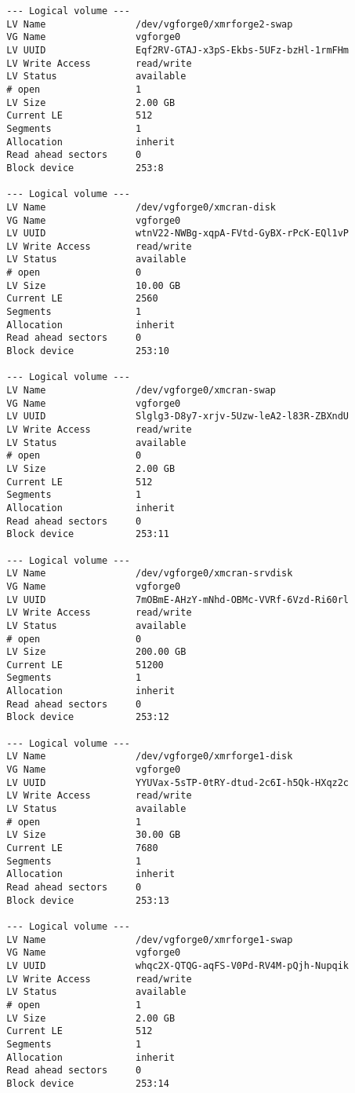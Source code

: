 \documentclass[a4paper]{article}
\begin{document}
\begin{verbatim}
  --- Logical volume ---
  LV Name                /dev/vgforge0/xmrforge2-swap
  VG Name                vgforge0
  LV UUID                Eqf2RV-GTAJ-x3pS-Ekbs-5UFz-bzHl-1rmFHm
  LV Write Access        read/write
  LV Status              available
  # open                 1
  LV Size                2.00 GB
  Current LE             512
  Segments               1
  Allocation             inherit
  Read ahead sectors     0
  Block device           253:8
   
  --- Logical volume ---
  LV Name                /dev/vgforge0/xmcran-disk
  VG Name                vgforge0
  LV UUID                wtnV22-NWBg-xqpA-FVtd-GyBX-rPcK-EQl1vP
  LV Write Access        read/write
  LV Status              available
  # open                 0
  LV Size                10.00 GB
  Current LE             2560
  Segments               1
  Allocation             inherit
  Read ahead sectors     0
  Block device           253:10
   
  --- Logical volume ---
  LV Name                /dev/vgforge0/xmcran-swap
  VG Name                vgforge0
  LV UUID                Slglg3-D8y7-xrjv-5Uzw-leA2-l83R-ZBXndU
  LV Write Access        read/write
  LV Status              available
  # open                 0
  LV Size                2.00 GB
  Current LE             512
  Segments               1
  Allocation             inherit
  Read ahead sectors     0
  Block device           253:11
   
  --- Logical volume ---
  LV Name                /dev/vgforge0/xmcran-srvdisk
  VG Name                vgforge0
  LV UUID                7mOBmE-AHzY-mNhd-OBMc-VVRf-6Vzd-Ri60rl
  LV Write Access        read/write
  LV Status              available
  # open                 0
  LV Size                200.00 GB
  Current LE             51200
  Segments               1
  Allocation             inherit
  Read ahead sectors     0
  Block device           253:12
   
  --- Logical volume ---
  LV Name                /dev/vgforge0/xmrforge1-disk
  VG Name                vgforge0
  LV UUID                YYUVax-5sTP-0tRY-dtud-2c6I-h5Qk-HXqz2c
  LV Write Access        read/write
  LV Status              available
  # open                 1
  LV Size                30.00 GB
  Current LE             7680
  Segments               1
  Allocation             inherit
  Read ahead sectors     0
  Block device           253:13
   
  --- Logical volume ---
  LV Name                /dev/vgforge0/xmrforge1-swap
  VG Name                vgforge0
  LV UUID                whqc2X-QTQG-aqFS-V0Pd-RV4M-pQjh-Nupqik
  LV Write Access        read/write
  LV Status              available
  # open                 1
  LV Size                2.00 GB
  Current LE             512
  Segments               1
  Allocation             inherit
  Read ahead sectors     0
  Block device           253:14

\end{verbatim}
\end{document}
